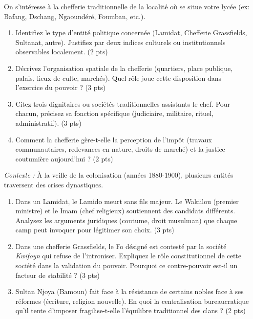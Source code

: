 \documentclass[11pt]{article}
\begin{document}
\begin{exercice}
On s'intéresse à la chefferie traditionnelle de la localité où se situe votre lycée (ex: Bafang, Dschang, Ngaoundéré, Foumban, etc.).
\begin{enumerate}
    \item Identifiez le type d'entité politique concernée (Lamidat, Chefferie Grassfields, Sultanat, autre). Justifiez par deux indices culturels ou institutionnels observables localement. (2 pts)
    \item Décrivez l'organisation spatiale de la chefferie (quartiers, place publique, palais, lieux de culte, marchés). Quel rôle joue cette disposition dans l'exercice du pouvoir ? (3 pts)
    \item Citez trois dignitaires ou sociétés traditionnelles assistants le chef. Pour chacun, précisez sa fonction spécifique (judiciaire, militaire, rituel, administratif). (3 pts)
    \item Comment la chefferie gère-t-elle la perception de l'impôt (travaux communautaires, redevances en nature, droits de marché) et la justice coutumière aujourd'hui ? (2 pts)
\end{enumerate}
\end{exercice}

\begin{exercice}
\textit{Contexte :} À la veille de la colonisation (années 1880-1900), plusieurs entités traversent des crises dynastiques.
\begin{enumerate}
    \item Dans un Lamidat, le Lamido meurt sans fils majeur. Le Wakiilou (premier ministre) et le Imam (chef religieux) soutiennent des candidats différents. Analysez les arguments juridiques (coutume, droit musulman) que chaque camp peut invoquer pour légitimer son choix. (3 pts)
    \item Dans une chefferie Grassfields, le Fo désigné est contesté par la société \textit{Kwifoyn} qui refuse de l'introniser. Expliquez le rôle constitutionnel de cette société dans la validation du pouvoir. Pourquoi ce contre-pouvoir est-il un facteur de stabilité ? (3 pts)
    \item Sultan Njoya (Bamoun) fait face à la résistance de certains nobles face à ses réformes (écriture, religion nouvelle). En quoi la centralisation bureaucratique qu'il tente d'imposer fragilise-t-elle l'équilibre traditionnel des clans ? (2 pts)
\end{enumerate}
\end{exercice}
\end{document}

